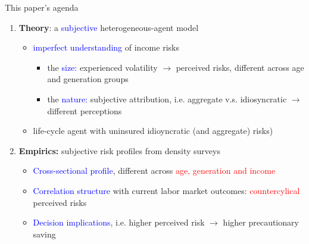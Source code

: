 \documentclass{beamer}
\begin{document}
\begin{frame}{This paper's agenda}
	\begin{enumerate}
			\item \textbf{Theory}: a \textcolor{blue}{subjective} heterogeneous-agent model 
		\begin{itemize}
			\item  \textcolor{blue}{imperfect understanding} of income risks
			\begin{itemize}
				\item the \textcolor{blue}{size:} experienced volatility $\rightarrow$  perceived risks, different across age and generation groups
				\item the \textcolor{blue}{nature:} subjective attribution, i.e.  aggregate v.s. idiosyncratic  $\rightarrow$ different perceptions
			\end{itemize}
			\item life-cycle agent with uninsured idioyncratic (and aggregate) risks)
		\end{itemize} 
		\item \textbf{Empirics:} subjective risk profiles from density surveys
		\begin{itemize}
			\item \textcolor{blue}{Cross-sectional profile}, different across \textcolor{red}{age, generation and income} 
			\item \textcolor{blue}{Correlation structure} with current labor market outcomes: \textcolor{red}{countercylical} perceived risks 
			\item \textcolor{blue}{Decision implications}, i.e. higher perceived risk $\rightarrow$ higher precautionary saving 
		\end{itemize}
	
	\end{enumerate}
\end{frame}
\end{document}
